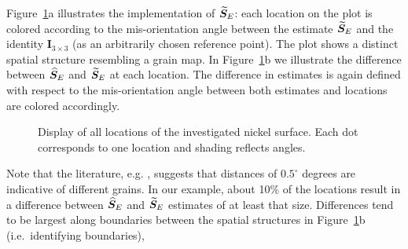 Figure~\ref{fig:grain-map}a illustrates the implementation of ${\widetilde{\bm S}_E}$: each location on the plot is colored according to the mis-orientation angle between  the estimate ${\widetilde{\bm S}_E}$  and the identity $\bm I_{3\times 3}$ (as an arbitrarily chosen reference point).  The plot shows a distinct spatial structure resembling a grain map. In Figure~\ref{fig:grain-map}b we illustrate the difference between ${\widehat{\bm S}_E}$ and ${\widetilde{\bm S}_E}$ at each location. The difference in estimates is again defined with respect to the mis-orientation angle between both estimates and locations are colored accordingly. 
%
\begin{figure}[h!] %
   \centering
   \caption{ \label{fig:grain-map}  Display of all locations of the investigated nickel surface. Each dot corresponds to one location and shading reflects  angles. }
\end{figure}
%
Note that the literature, e.g. \cite{bingham10b}, suggests that distances of $0.5^\circ$ degrees are indicative of different grains. In our example, about 10\% of the locations result in a difference between ${\widehat{\bm S}_E}$ and ${\widetilde{\bm S}_E}$ estimates of at least that size. Differences tend to be largest along boundaries between the spatial structures in Figure~\ref{fig:grain-map}b  (i.e.~identifying boundaries), 

